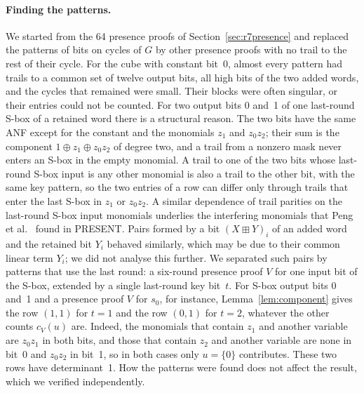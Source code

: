 \documentclass[pdflatex,sn-mathphys-num]{sn-jnl}
\theoremstyle{thmstyleone}
\theoremstyle{thmstylethree}
\theoremstyle{thmstyletwo}
\newcommand{\modadd}{\boxplus}
\begin{document}
\paragraph{Finding the patterns.} We started from the 64 presence proofs of Section~\ref{sec:r7presence} and replaced the patterns of bits on cycles of $G$ by other presence proofs with no trail to the rest of their cycle. For the cube with constant bit~0, almost every pattern had trails to a common set of twelve output bits, all high bits of the two added words, and the cycles that remained were small. Their blocks were often singular, or their entries could not be counted. For two output bits 0 and~1 of one last-round S-box of a retained word there is a structural reason. The two bits have the same ANF except for the constant and the monomials $z_1$ and $z_0z_2$; their sum is the component $1\oplus z_1\oplus z_0z_2$ of degree two, and a trail from a nonzero mask never enters an S-box in the empty monomial. A trail to one of the two bits whose last-round S-box input is any other monomial is also a trail to the other bit, with the same key pattern, so the two entries of a row can differ only through trails that enter the last S-box in $z_1$ or $z_0z_2$. A similar dependence of trail parities on the last-round S-box input monomials underlies the interfering monomials that Peng et al.~\cite{peng2026} found in PRESENT. Pairs formed by a bit $(X\modadd Y)_i$ of an added word and the retained bit $Y_i$ behaved similarly, which may be due to their common linear term $Y_i$; we did not analyse this further. We separated such pairs by patterns that use the last round: a six-round presence proof $V$ for one input bit of the S-box, extended by a single last-round key bit~$t$. For S-box output bits 0 and~1 and a presence proof $V$ for $s_0$, for instance, Lemma~\ref{lem:component} gives the row $(1,1)$ for $t=1$ and the row $(0,1)$ for $t=2$, whatever the other counts $c_V(u)$ are. Indeed, the monomials that contain $z_1$ and another variable are $z_0z_1$ in both bits, and those that contain $z_2$ and another variable are none in bit~0 and $z_0z_2$ in bit~1, so in both cases only $u=\{0\}$ contributes. These two rows have determinant~1. How the patterns were found does not affect the result, which we verified independently.
\end{document}
